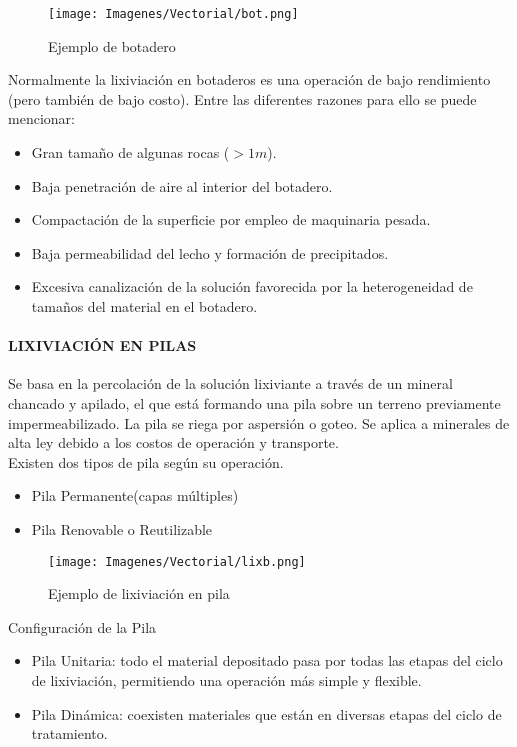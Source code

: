 \begin{figure}[H]
 \centering
 \texttt{[image: Imagenes/Vectorial/bot.png]}
 \caption{Ejemplo de botadero}
 \label{fig:bot}
\end{figure}
  
Normalmente la lixiviaci\'on en botaderos es una operaci\'on de bajo rendimiento (pero tambi\'en de bajo costo). Entre las diferentes razones para ello se puede mencionar:
\begin{itemize}
 \item Gran tama\~no de algunas rocas ($> 1 m$).
 \item Baja penetraci\'on de aire al interior del botadero.
 \item Compactaci\'on de la superficie por empleo de maquinaria pesada.
 \item Baja permeabilidad del lecho y formaci\'on de precipitados.
 \item Excesiva canalizaci\'on de la soluci\'on favorecida por la heterogeneidad de tama\~nos del material en el botadero.
\end{itemize}

\paragraph{LIXIVIACI\'ON EN PILAS}
Se basa en la percolaci\'on de la soluci\'on lixiviante a trav\'es de un mineral chancado y apilado, el que est\'a formando una pila sobre un terreno previamente impermeabilizado. La pila se riega por aspersi\'on o goteo. Se aplica a minerales de alta ley debido a los costos de operaci\'on y transporte.\\
Existen dos tipos de pila seg\'un su operaci\'on.\\
\begin{itemize}
 \item Pila Permanente(capas m\'ultiples)
 \item Pila Renovable o Reutilizable  
\end{itemize}
\begin{figure}[H]
 \centering
 \texttt{[image: Imagenes/Vectorial/lixb.png]}
 \caption{Ejemplo de lixiviaci\'on en pila}
 \label{fig:libx}
\end{figure}

Configuraci\'on de la Pila\\
\begin{itemize}
 \item Pila Unitaria: todo el material depositado pasa por todas las etapas del ciclo de lixiviaci\'on, permitiendo una operaci\'on m\'as simple y flexible.
 \item Pila Din\'amica: coexisten materiales que est\'an en diversas etapas del ciclo de tratamiento.
\end{itemize}

